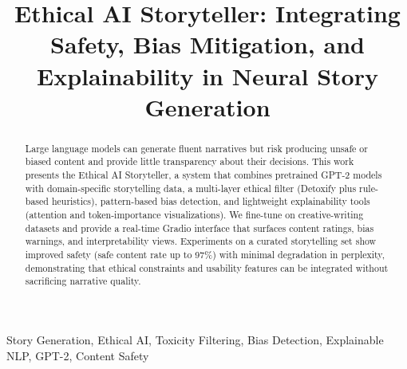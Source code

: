 \documentclass[conference]{IEEEtran}
\begin{document}
\title{Ethical AI Storyteller: Integrating Safety, Bias Mitigation, and Explainability in Neural Story Generation}

\author{
\and
{}
\and
{}
}

\maketitle

\begin{abstract}
Large language models can generate fluent narratives but risk producing unsafe or biased content and provide little transparency about their decisions. This work presents the Ethical AI Storyteller, a system that combines pretrained GPT-2 models with domain-specific storytelling data, a multi-layer ethical filter (Detoxify plus rule-based heuristics), pattern-based bias detection, and lightweight explainability tools (attention and token-importance visualizations). We fine-tune on creative-writing datasets and provide a real-time Gradio interface that surfaces content ratings, bias warnings, and interpretability views. Experiments on a curated storytelling set show improved safety (safe content rate up to 97\%) with minimal degradation in perplexity, demonstrating that ethical constraints and usability features can be integrated without sacrificing narrative quality.
\end{abstract}

\begin{IEEEkeywords}
Story Generation, Ethical AI, Toxicity Filtering, Bias Detection, Explainable NLP, GPT-2, Content Safety
\end{IEEEkeywords}
\end{document}
